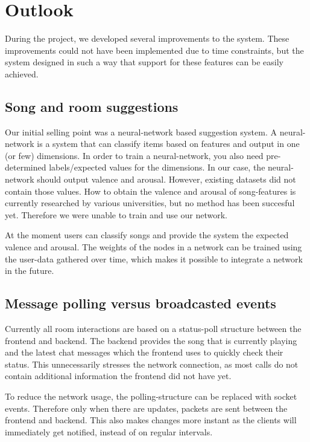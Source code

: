 \chapter{Outlook}
During the project, we developed several improvements to the system.
These improvements could not have been implemented due to time constraints, but the system designed in such a way that support for these features can be easily achieved.

\label{outlook-neural}
\section{Song and room suggestions}
Our initial selling point was a neural-network based suggestion system.
A neural-network is a system that can classify items based on features and output in one (or few) dimensions.
In order to train a neural-network, you also need pre-determined labels/expected values for the dimensions.
In our case, the neural-network should output \gls{valence} and \gls{arousal}.
However, existing datasets did not contain those values.
How to obtain the valence and arousal of song-features is currently researched by various universities, but no method has been succesful yet.
Therefore we were unable to train and use our network.

At the moment users can classify songs and provide the system the expected valence and arousal.
The weights of the nodes in a network can be trained using the user-data gathered over time, which makes it possible to integrate a network in the future.

\section{Message polling versus broadcasted events}
Currently all room interactions are based on a status-poll structure between the frontend and backend.
The backend provides the song that is currently playing and the latest chat messages which the frontend uses to quickly check their status.
This unnecessarily stresses the network connection, as most calls do not contain additional information the frontend did not have yet.

To reduce the network usage, the polling-structure can be replaced with socket events.
Therefore only when there are updates, packets are sent between the frontend and backend.
This also makes changes more instant as the clients will immediately get notified, instead of on regular intervals.

